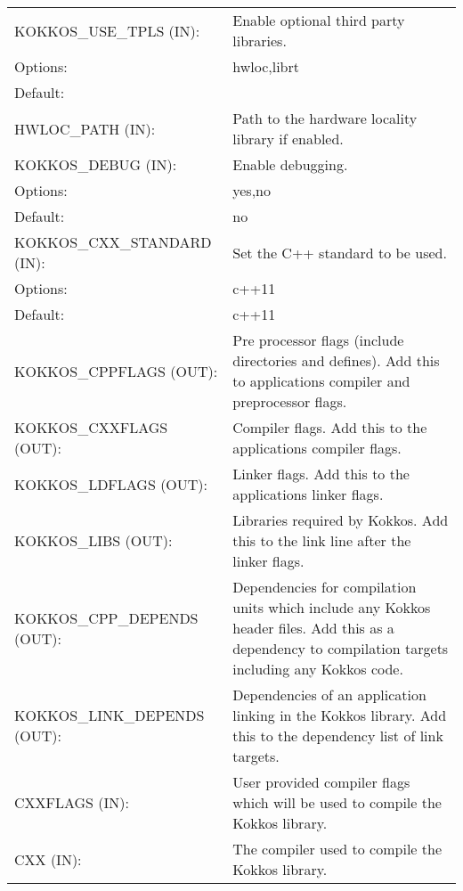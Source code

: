 \begin{table}
\begin{small}
\begin{tabular}[t]{p{}p{}}
\hline
   KOKKOS\_USE\_TPLS (IN): & Enable optional third party libraries. \\
      \hspace{0.5cm}Options: & hwloc,librt \\
      \hspace{0.5cm}Default: & \\

\hline
   HWLOC\_PATH (IN): & Path to the hardware locality library if enabled. \\

\hline
    KOKKOS\_DEBUG (IN): & Enable debugging. \\
      \hspace{0.5cm}Options: & yes,no \\
      \hspace{0.5cm}Default: & no \\

\hline
    KOKKOS\_CXX\_STANDARD (IN): & Set the C++ standard to be used. \\
      \hspace{0.5cm}Options: & c++11 \\
      \hspace{0.5cm}Default: & c++11 \\

\hline\hline

    KOKKOS\_CPPFLAGS (OUT): & Pre processor flags (include directories and defines). 
                              Add this to applications compiler and preprocessor flags. \\

\hline
    KOKKOS\_CXXFLAGS (OUT): & Compiler flags. Add this to the applications compiler flags. \\

\hline
    KOKKOS\_LDFLAGS (OUT): & Linker flags. Add this to the applications linker flags. \\

\hline
    KOKKOS\_LIBS (OUT): & Libraries required by Kokkos. Add this to the link line after the linker flags. \\

\hline
    KOKKOS\_CPP\_DEPENDS (OUT): & Dependencies for compilation units which include any Kokkos header files.
                                  Add this as a dependency to compilation targets including any Kokkos code. \\

\hline
    KOKKOS\_LINK\_DEPENDS (OUT): & Dependencies of an application linking in the Kokkos library.
                                   Add this to the dependency list of link targets. \\
 
\hline\hline
    CXXFLAGS (IN): & User provided compiler flags which will be used to compile the Kokkos library. \\

\hline
    CXX (IN): & The compiler used to compile the Kokkos library. \\
\hline\hline
\end{tabular}
\end{small}
\end{table}

